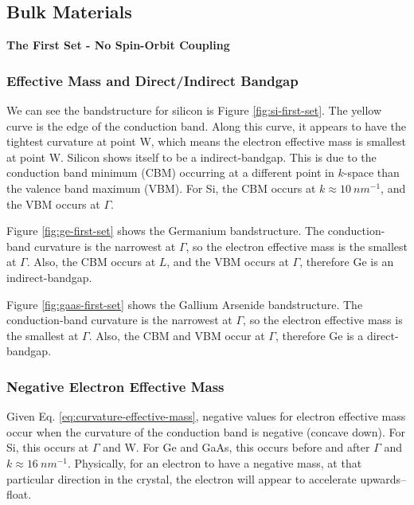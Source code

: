 \documentclass{IEEEtran}
\begin{document}
\subsection{Bulk Materials}

\textbf{The First Set - No Spin-Orbit Coupling}

\subsubsection{Effective Mass and Direct/Indirect Bandgap}

We can see the bandstructure for silicon is Figure \ref{fig:si-first-set}. The yellow curve is the edge of the conduction band. Along this curve, it appears to have the tightest curvature at point W, which means the electron effective mass is smallest at point W. Silicon shows itself to be a indirect-bandgap. This is due to the conduction band minimum (CBM) occurring at a different point in \(k\)-space than the valence band maximum (VBM). For Si, the CBM occurs at \(k \approx 10 ~ nm^{-1}\), and the VBM occurs at \(\Gamma\).

Figure \ref{fig:ge-first-set} shows the Germanium bandstructure. The conduction-band curvature is the narrowest at \(\Gamma\), so the electron effective mass is the smallest at \(\Gamma\). Also, the CBM occurs at \(L\), and the VBM occurs at \(\Gamma\), therefore Ge is an indirect-bandgap.

Figure \ref{fig:gaas-first-set} shows the Gallium Arsenide bandstructure. The conduction-band curvature is the narrowest at \(\Gamma\), so the electron effective mass is the smallest at \(\Gamma\). Also, the CBM and VBM occur at \(\Gamma\), therefore Ge is a direct-bandgap. 

\subsubsection{Negative Electron Effective Mass}

Given Eq. \ref{eq:curvature-effective-mass}, negative values for electron effective mass occur when the curvature of the conduction band is negative (concave down). For Si, this occurs at \(\Gamma\) and W. For Ge and GaAs, this occurs before and after \(\Gamma\) and \(k \approx 16 ~ nm^{-1}\). Physically, for an electron to have a negative mass, at that particular direction in the crystal, the electron will appear to accelerate upwards--float.

\end{document}
